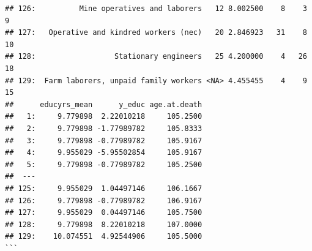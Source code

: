 \documentclass[]{book}
\begin{document}
\begin{verbatim}
## 126:          Mine operatives and laborers   12 8.002500    8    3           9
## 127:   Operative and kindred workers (nec)   20 2.846923   31    8          10
## 128:                  Stationary engineers   25 4.200000    4   26          18
## 129:  Farm laborers, unpaid family workers <NA> 4.455455    4    9          15
##      educyrs_mean      y_educ age.at.death
##   1:     9.779898  2.22010218     105.2500
##   2:     9.779898 -1.77989782     105.8333
##   3:     9.779898 -0.77989782     105.9167
##   4:     9.955029 -5.95502854     105.9167
##   5:     9.779898 -0.77989782     105.2500
##  ---                                      
## 125:     9.955029  1.04497146     106.1667
## 126:     9.779898 -0.77989782     106.9167
## 127:     9.955029  0.04497146     105.7500
## 128:     9.779898  8.22010218     107.0000
## 129:    10.074551  4.92544906     105.5000
```


\end{verbatim}
\end{document}
